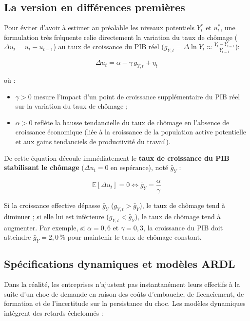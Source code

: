 \documentclass[11pt,a4paper]{article}
\begin{document}
\subsection{La version en différences premières}

Pour éviter d'avoir à estimer au préalable les niveaux potentiels $Y_t^*$ et $u_t^*$, une formulation très fréquente relie directement la variation du taux de chômage ($\Delta u_t = u_t - u_{t-1}$) au taux de croissance du PIB réel ($g_{Y,t} = \Delta \ln Y_t \approx \frac{Y_t - Y_{t-1}}{Y_{t-1}}$):

\begin{equation}
\Delta u_t = \alpha - \gamma \, g_{Y,t} + \eta_t
\end{equation}

où :
\begin{itemize}[leftmargin=1.5em]
    \item $\gamma > 0$ mesure l'impact d'un point de croissance supplémentaire du PIB réel sur la variation du taux de chômage ;
    \item $\alpha > 0$ reflète la hausse tendancielle du taux de chômage en l'absence de croissance économique (liée à la croissance de la population active potentielle et aux gains tendanciels de productivité du travail).
\end{itemize}

De cette équation découle immédiatement le \textbf{taux de croissance du PIB stabilisant le chômage} ($\Delta u_t = 0$ en espérance), noté $\bar{g}_Y$ :

\begin{equation}
\mathbb{E}[\Delta u_t] = 0 \iff \bar{g}_Y = \frac{\alpha}{\gamma}
\end{equation}

Si la croissance effective dépasse $\bar{g}_Y$ ($g_{Y,t} > \bar{g}_Y$), le taux de chômage tend à diminuer ; si elle lui est inférieure ($g_{Y,t} < \bar{g}_Y$), le taux de chômage tend à augmenter. Par exemple, si $\alpha = 0{,}6$ et $\gamma = 0{,}3$, la croissance du PIB doit atteindre $\bar{g}_Y = 2{,}0\,\%$ pour maintenir le taux de chômage constant.

\subsection{Spécifications dynamiques et modèles ARDL}

Dans la réalité, les entreprises n'ajustent pas instantanément leurs effectifs à la suite d'un choc de demande en raison des coûts d'embauche, de licenciement, de formation et de l'incertitude sur la persistance du choc. Les modèles dynamiques intègrent des retards échelonnés :
\end{document}
